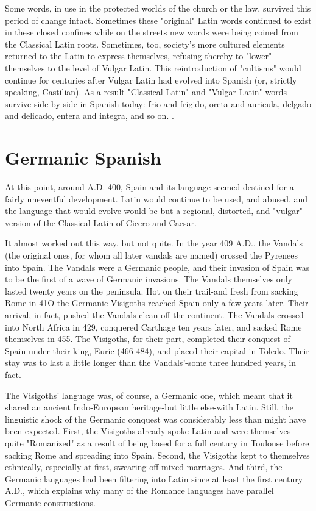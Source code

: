 Some words, in use in the protected worlds of the church or
the law, survived this period of change intact. Sometimes these "original" Latin words continued to exist in these closed confines while
on the streets new words were being coined from the Classical Latin
roots. Sometimes, too, society's more cultured elements returned to
the Latin to express themselves, refusing thereby to "lower" themselves to the level of Vulgar Latin. This reintroduction of "cultisms"
would continue for centuries after Vulgar Latin had evolved into Spanish (or, strictly speaking, Castilian). As a result "Classical Latin" and
"Vulgar Latin" words survive side by side in Spanish today: frio and
frigido, oreta and auricula, delgado and delicado, entera and integra,
and so on. .

\section{Germanic Spanish}

At this point, around A.D. 400, Spain and its language seemed
destined for a fairly uneventful development. Latin would continue to
be used, and abused, and the language that would evolve would be but
a regional, distorted, and "vulgar" version of the Classical Latin of
Cicero and Caesar.

It almost worked out this way, but not quite. In the year
409 A.D., the Vandals (the original ones, for whom all later vandals are
named) crossed the Pyrenees into Spain. The Vandals were a Germanic
people, and their invasion of Spain was to be the first of a wave of Germanic invasions. The Vandals themselves only lasted twenty years
on the peninsula. Hot on their trail-and fresh from sacking Rome in
41O-the Germanic Visigoths reached Spain only a few years later.
Their arrival, in fact, pushed the Vandals clean off the continent. The
Vandals crossed into North Africa in 429, conquered Carthage ten
years later, and sacked Rome themselves in 455. The Visigoths, for
their part, completed their conquest of Spain under their king, Euric
(466-484), and placed their capital in Toledo. Their stay was to last a
little longer than the Vandals'-some three hundred years, in fact.

The Visigoths' language was, of course, a Germanic one,
which meant that it shared an ancient Indo-European heritage-but
little else-with Latin. Still, the linguistic shock of the Germanic conquest was considerably less than might have been expected. First, the
Visigoths already spoke Latin and were themselves quite "Romanized"
as a result of being based for a full century in Toulouse before sacking
Rome and spreading into Spain. Second, the Visigoths kept to themselves ethnically, especially at first, swearing off mixed marriages. And
third, the Germanic languages had been filtering into Latin since at
least the first century A.D., which explains why many of the Romance
languages have parallel Germanic constructions.

